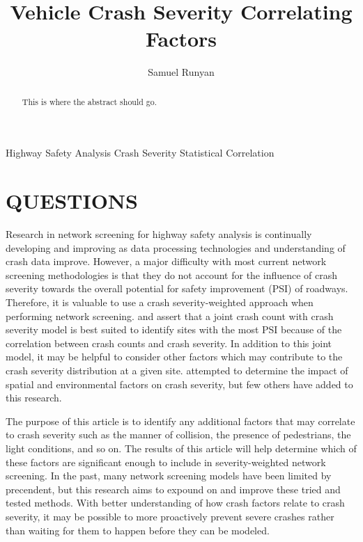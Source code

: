 \documentclass[3p, authoryear]{elsarticle} %
\begin{document}
\begin{frontmatter}

  \title{Vehicle Crash Severity Correlating Factors}
    \author[Brigham Young University]{Samuel Runyan}
      \address[Brigham Young University]{Civil and Environmental Engineering Department, 430 Engineering Building, Provo, Utah 84602}
    
  \begin{abstract}
  This is where the abstract should go.
  \end{abstract}
   \begin{keyword} Highway Safety Analysis Crash Severity Statistical Correlation\end{keyword}
 \end{frontmatter}

\hypertarget{intro}{%
\section{QUESTIONS}\label{intro}}

Research in network screening for highway safety analysis is continually developing and improving as data processing technologies and understanding of crash data improve. However, a major difficulty with most current network screening methodologies is that they do not account for the influence of crash severity towards the overall potential for safety improvement (PSI) of roadways. Therefore, it is valuable to use a crash severity-weighted approach when performing network screening. \cite{yasmin2018} and \cite{afghari2020} assert that a joint crash count with crash severity model is best suited to identify sites with the most PSI because of the correlation between crash counts and crash severity. In addition to this joint model, it may be helpful to consider other factors which may contribute to the crash severity distribution at a given site. \cite{ghadi2020} attempted to determine the impact of spatial and environmental factors on crash severity, but few others have added to this research.

The purpose of this article is to identify any additional factors that may correlate to crash severity such as the manner of collision, the presence of pedestrians, the light conditions, and so on. The results of this article will help determine which of these factors are significant enough to include in severity-weighted network screening. In the past, many network screening models have been limited by precendent, but this research aims to expound on and improve these tried and tested methods. With better understanding of how crash factors relate to crash severity, it may be possible to more proactively prevent severe crashes rather than waiting for them to happen before they can be modeled.
\end{document}
